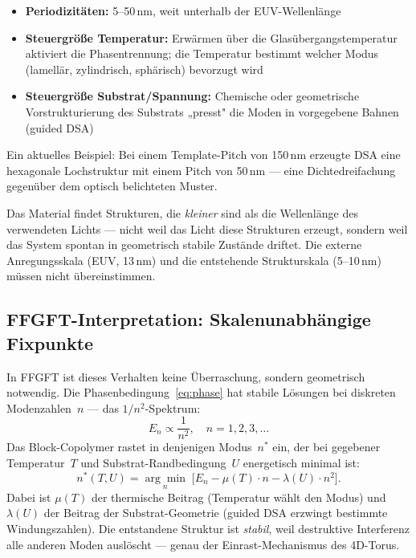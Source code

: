\begin{itemize}
  \item \textbf{Periodizitäten:} 5--50\,nm, weit unterhalb der EUV-Wellenlänge
  \item \textbf{Steuergröße Temperatur:} Erwärmen über die Glasübergangstemperatur
    aktiviert die Phasentrennung; die Temperatur bestimmt welcher Modus
    (lamellär, zylindrisch, sphärisch) bevorzugt wird
  \item \textbf{Steuergröße Substrat/Spannung:} Chemische oder geometrische
    Vorstrukturierung des Substrats „presst" die Moden in vorgegebene Bahnen
    (guided DSA)
\end{itemize}

\noindent Ein aktuelles Beispiel: Bei einem Template-Pitch von 150\,nm
erzeugte DSA eine hexagonale Lochstruktur mit einem Pitch von 50\,nm —
eine Dichtedreifachung gegenüber dem optisch belichteten Muster.

\begin{warnbox}
Das Material findet Strukturen, die \emph{kleiner} sind als die Wellenlänge
des verwendeten Lichts — nicht weil das Licht diese Strukturen erzeugt,
sondern weil das System spontan in geometrisch stabile Zustände driftet.
Die externe Anregungsskala (EUV, 13\,nm) und die entstehende Strukturskala
(5--10\,nm) müssen nicht übereinstimmen.
\end{warnbox}

\subsection{FFGFT-Interpretation: Skalenunabhängige Fixpunkte}

In FFGFT ist dieses Verhalten keine Überraschung, sondern geometrisch
notwendig. Die Phasenbedingung~\eqref{eq:phase} hat stabile Lösungen
bei diskreten Modenzahlen~$n$ — das $1/n^2$-Spektrum:
\begin{equation}
  E_n \propto \frac{1}{n^2}, \quad n = 1, 2, 3, \ldots
\end{equation}
Das Block-Copolymer rastet in denjenigen Modus~$n^*$ ein, der bei
gegebener Temperatur~$T$ und Substrat-Randbedingung~$U$ energetisch
minimal ist:
\begin{equation}
  n^*(T, U) = \underset{n}{\arg\min}\;
    \bigl[ E_n - \mu(T)\cdot n - \lambda(U)\cdot n^2 \bigr].
\end{equation}
Dabei ist $\mu(T)$ der thermische Beitrag (Temperatur wählt den Modus)
und $\lambda(U)$ der Beitrag der Substrat-Geometrie (guided DSA erzwingt
bestimmte Windungszahlen). Die entstandene Struktur ist \emph{stabil},
weil destruktive Interferenz alle anderen Moden auslöscht — genau der
Einrast-Mechanismus des 4D-Torus.

